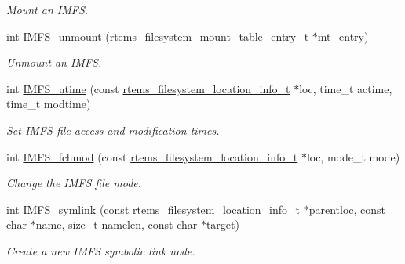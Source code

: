 \begin{DoxyCompactItemize}
\begin{DoxyCompactList}\small\item\em Mount an I\+M\+FS. \end{DoxyCompactList}\item 
\mbox{\label{group__IMFS_ga6ed73e68fddfb2d2f38dfe8d0d7b84a5}} 
int \mbox{\hyperlink{group__IMFS_ga6ed73e68fddfb2d2f38dfe8d0d7b84a5}{I\+M\+F\+S\+\_\+unmount}} (\mbox{\hyperlink{structrtems__filesystem__mount__table__entry__tt}{rtems\+\_\+filesystem\+\_\+mount\+\_\+table\+\_\+entry\+\_\+t}} $\ast$mt\+\_\+entry)
\begin{DoxyCompactList}\small\item\em Unmount an I\+M\+FS. \end{DoxyCompactList}\item 
int \mbox{\hyperlink{group__IMFS_ga97e0148e68fe08d9dae38257016416c7}{I\+M\+F\+S\+\_\+utime}} (const \mbox{\hyperlink{group__LibIO_ga3252b3d31ee3c49ffff0b7604a676864}{rtems\+\_\+filesystem\+\_\+location\+\_\+info\+\_\+t}} $\ast$loc, time\+\_\+t actime, time\+\_\+t modtime)
\begin{DoxyCompactList}\small\item\em Set I\+M\+FS file access and modification times. \end{DoxyCompactList}\item 
\mbox{\label{group__IMFS_gaf8c9fc49f2cc54393013c9958e93e0f1}} 
int \mbox{\hyperlink{group__IMFS_gaf8c9fc49f2cc54393013c9958e93e0f1}{I\+M\+F\+S\+\_\+fchmod}} (const \mbox{\hyperlink{group__LibIO_ga3252b3d31ee3c49ffff0b7604a676864}{rtems\+\_\+filesystem\+\_\+location\+\_\+info\+\_\+t}} $\ast$loc, mode\+\_\+t mode)
\begin{DoxyCompactList}\small\item\em Change the I\+M\+FS file mode. \end{DoxyCompactList}\item 
int \mbox{\hyperlink{group__IMFS_ga7a51f947488c9d574dfb8da0a9e295bd}{I\+M\+F\+S\+\_\+symlink}} (const \mbox{\hyperlink{group__LibIO_ga3252b3d31ee3c49ffff0b7604a676864}{rtems\+\_\+filesystem\+\_\+location\+\_\+info\+\_\+t}} $\ast$parentloc, const char $\ast$name, size\+\_\+t namelen, const char $\ast$target)
\begin{DoxyCompactList}\small\item\em Create a new I\+M\+FS symbolic link node. \end{DoxyCompactList}\item 

\end{DoxyCompactItemize}
